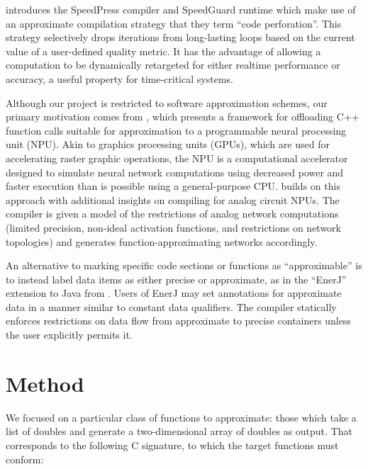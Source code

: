 \documentclass{article}
\begin{document}
\cite{Agarwal09} introduces the SpeedPress compiler and SpeedGuard runtime which make use of an approximate compilation strategy that they term ``code perforation''. This strategy selectively drops iterations from long-lasting loops based on the current value of a user-defined quality metric. It has the advantage of allowing a computation to be dynamically retargeted for either realtime performance or accuracy, a useful property for time-critical systems.

Although our project is restricted to software approximation schemes, our primary motivation comes from \cite{Esmaeilzadeh12}, which presents a framework for offloading C++ function calls suitable for approximation to a programmable neural processing unit (NPU). Akin to graphics processing units (GPUs), which are used for accelerating raster graphic operations, the NPU is a computational accelerator designed to simulate neural network computations using decreased power and faster execution than is possible using a general-purpose CPU. \cite{Amant14} builds on this approach with additional insights on compiling for analog circuit NPUs. The compiler is given a model of the restrictions of analog network computations (limited precision, non-ideal activation functions, and restrictions on network topologies) and generates function-approximating networks accordingly.

An alternative to marking specific code sections or functions as ``approximable'' is to instead label data items as either precise or approximate, as in the ``EnerJ'' extension to Java from \cite{Sampson11}. Users of EnerJ may set annotations for approximate data in a manner similar to constant data qualifiers. The compiler statically enforces restrictions on data flow from approximate to precise containers unless the user explicitly permits it.

\section{Method}

We focused on a particular class of functions to approximate: those which take a list of doubles and generate a two-dimensional array of doubles as output. That corresponds to the following C signature, to which the target functions must conform:
\end{document}
